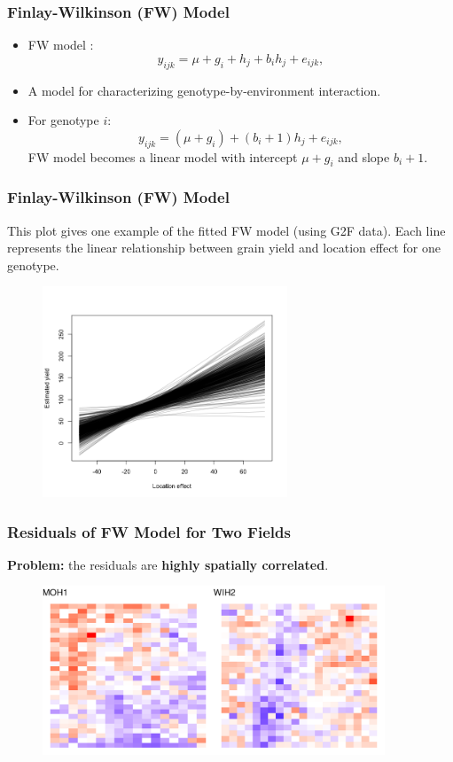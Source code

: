 \documentclass{beamer}
\begin{document}
\begin{frame}
	\frametitle{Finlay-Wilkinson (FW) Model}
	\begin{itemize}
	\item FW model \citep{finlay1963analysis}: 
	$$y_{ijk} = \mu + g_i + h_j + b_i h_j + e_{ijk},$$
	\item A model for characterizing genotype-by-environment interaction.
 \item For genotype $i$:
 $$y_{ijk} = (\mu + g_i) +  (b_i + 1) h_j + e_{ijk},$$
 FW model becomes a linear model with intercept $\mu + g_i$ and slope $b_i + 1 $.
	\end{itemize}		
\end{frame}



\begin{frame}
\frametitle{Finlay-Wilkinson (FW) Model}
This plot gives one example of the fitted FW model (using G2F data). Each line represents the linear relationship between grain yield and location effect for one genotype.
	\begin{figure}[H]
		\centering
		\includegraphics[width = 0.65\textwidth]{image8.png}
	\end{figure}
\end{frame}




\begin{frame}
	\frametitle{Residuals of FW Model for Two Fields}
	\textbf{Problem:} the residuals are \textbf{highly spatially correlated}.
	\begin{figure}[H]
		\centering
		\includegraphics[width = 0.91\textwidth]{resid_plot_2.pdf}
	\end{figure}
\end{frame}
\end{document}
